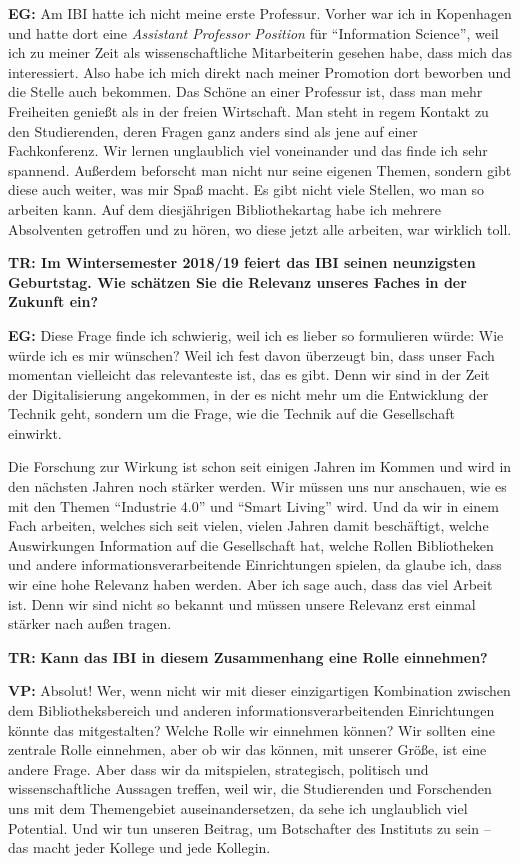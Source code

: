 \documentclass[a4paper,
fontsize=11pt,
oneside,
numbers=noperiodatend,
parskip=half-,
bibliography=totoc,
final
]{scrartcl}
\begin{document}
\textbf{EG:} Am IBI hatte ich nicht meine erste Professur. Vorher war
ich in Kopenhagen und hatte dort eine \emph{Assistant Professor
Position} für \enquote{Information Science}, weil ich zu meiner Zeit als
wissenschaftliche Mitarbeiterin gesehen habe, dass mich das
interessiert. Also habe ich mich direkt nach meiner Promotion dort
beworben und die Stelle auch bekommen. Das Schöne an einer Professur
ist, dass man mehr Freiheiten genießt als in der freien Wirtschaft. Man
steht in regem Kontakt zu den Studierenden, deren Fragen ganz anders
sind als jene auf einer Fachkonferenz. Wir lernen unglaublich viel
voneinander und das finde ich sehr spannend. Außerdem beforscht man
nicht nur seine eigenen Themen, sondern gibt diese auch weiter, was mir
Spaß macht. Es gibt nicht viele Stellen, wo man so arbeiten kann. Auf
dem diesjährigen Bibliothekartag habe ich mehrere Absolventen getroffen
und zu hören, wo diese jetzt alle arbeiten, war wirklich toll.

\textbf{TR: Im Wintersemester 2018/19 feiert das IBI seinen neunzigsten
Geburtstag. Wie schätzen Sie die Relevanz unseres Faches in der Zukunft
ein?}

\textbf{EG:} Diese Frage finde ich schwierig, weil ich es lieber so
formulieren würde: Wie würde ich es mir wünschen? Weil ich fest davon
überzeugt bin, dass unser Fach momentan vielleicht {das} relevanteste
ist, das es gibt. Denn wir sind in der Zeit der Digitalisierung
angekommen, in der es nicht mehr um die Entwicklung der Technik geht,
sondern um die Frage, wie die Technik auf die Gesellschaft einwirkt.

Die Forschung zur Wirkung ist schon seit einigen Jahren im Kommen und
wird in den nächsten Jahren noch stärker werden. Wir müssen uns nur
anschauen, wie es mit den Themen \enquote{Industrie 4.0} und
\enquote{Smart Living} wird. Und da wir in einem Fach arbeiten, welches
sich seit vielen, vielen Jahren damit beschäftigt, welche Auswirkungen
Information auf die Gesellschaft hat, welche Rollen Bibliotheken und
andere informationsverarbeitende Einrichtungen spielen, da glaube ich,
dass wir eine hohe Relevanz haben werden. Aber ich sage auch, dass das
viel Arbeit ist. Denn wir sind nicht so bekannt und müssen unsere
Relevanz erst einmal stärker nach außen tragen.

\textbf{TR:} \textbf{Kann das IBI in diesem Zusammenhang eine Rolle
einnehmen?}

\textbf{VP:} Absolut! Wer, wenn nicht wir mit dieser einzigartigen
Kombination zwischen dem Bibliotheksbereich und anderen
informationsverarbeitenden Einrichtungen könnte das mitgestalten? Welche
Rolle wir einnehmen können? Wir {sollten} eine zentrale Rolle einnehmen,
aber ob wir das {können}, mit unserer Größe, ist eine andere Frage. Aber
dass wir da mitspielen, strategisch, politisch und wissenschaftliche
Aussagen treffen, weil wir, die Studierenden und Forschenden uns mit dem
Themengebiet auseinandersetzen, da sehe ich unglaublich viel Potential.
Und wir tun unseren Beitrag, um Botschafter des Instituts zu sein -- das
macht jeder Kollege und jede Kollegin.
\end{document}
